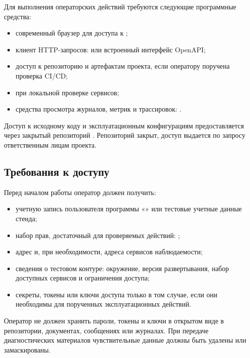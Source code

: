 \documentclass[12pt,a4paper]{extarticle}
\begin{document}
\begin{hseExample}
Для выполнения операторских действий требуются следующие программные средства:

\begin{itemize}[leftmargin=1.25cm]
    \item современный браузер для доступа к ;
    \item клиент HTTP-запросов:  или встроенный интерфейс OpenAPI;
    \item доступ к репозиторию  и артефактам проекта, если оператору поручена проверка CI/CD;
    \item {} при локальной проверке сервисов;
    \item средства просмотра журналов, метрик и трассировок: .
\end{itemize}

Доступ к исходному коду и эксплуатационным конфигурациям предоставляется через закрытый репозиторий . Репозиторий закрыт, доступ выдается по запросу ответственным лицам проекта.
\end{hseExample}

\subsection{Требования к доступу}

\begin{hseExample}
Перед началом работы оператор должен получить:

\begin{itemize}[leftmargin=1.25cm]
    \item учетную запись пользователя программы «\projectname» или тестовые учетные данные стенда;
    \item набор прав, достаточный для проверяемых действий: ;
    \item адрес  и, при необходимости, адреса сервисов наблюдаемости;
    \item сведения о тестовом контуре: окружение, версия развертывания, набор доступных сервисов и ограничения доступа;
    \item секреты, токены или ключи доступа только в том случае, если они необходимы для порученных эксплуатационных действий.
\end{itemize}

Оператор не должен хранить пароли, токены и ключи в открытом виде в репозитории, документах, сообщениях или журналах. При передаче диагностических материалов чувствительные данные должны быть удалены или замаскированы.
\end{hseExample}
\end{document}
